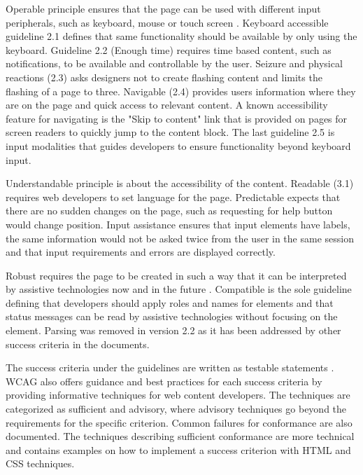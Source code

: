 Operable principle ensures that the page can be used with different input peripherals, such as keyboard, mouse or touch screen \cite{wcag22}. Keyboard accessible guideline 2.1 defines that same functionality should be available by only using the keyboard. Guideline 2.2 (Enough time) requires time based content, such as notifications, to be available and controllable by the user. Seizure and physical reactions (2.3) asks designers not to create flashing content and limits the flashing of a page to three. Navigable (2.4) provides users information where they are on the page and quick access to relevant content. A known accessibility feature for navigating is the "Skip to content" link that is provided on pages for screen readers to quickly jump to the content block. The last guideline 2.5 is input modalities that guides developers to ensure functionality beyond keyboard input.

Understandable principle is about the accessibility of the content. Readable (3.1) requires web developers to set language for the page. Predictable expects that there are no sudden changes on the page, such as requesting for help button would change position. Input assistance ensures that input elements have labels, the same information would not be asked twice from the user in the same session and that input requirements and errors are displayed correctly. 

Robust requires the page to be created in such a way that it can be interpreted by assistive technologies now and in the future \citep{wcag22}. Compatible is the sole guideline defining that developers should apply roles and names for elements and that status messages can be read by assistive technologies without focusing on the element. Parsing was removed in version 2.2 as it has been addressed by other success criteria in the documents.

The success criteria under the guidelines are written as testable statements \citep{wcag22}. WCAG also offers guidance and best practices for each success criteria by providing informative techniques for web content developers. The techniques are categorized as sufficient and advisory, where advisory techniques go beyond the requirements for the specific criterion. Common failures for conformance are also documented. The techniques describing sufficient conformance are more technical and contains examples on how to implement a success criterion with HTML and CSS techniques.





